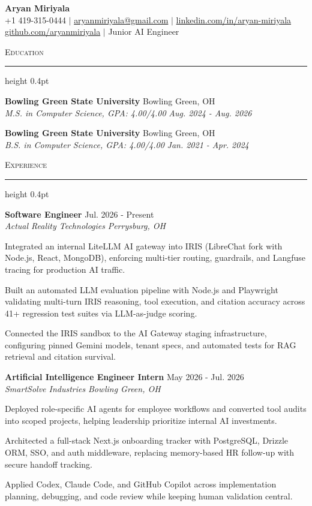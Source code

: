 \documentclass[letterpaper,11pt]{article}
\newcommand{\resumesection}[1]{%
  \par\vspace{2pt}%
  {\large\scshape #1}\par\vspace{2pt}%
  \hrule height 0.4pt\vspace{2pt}%
}
\newcommand{\resumeSubheading}[4]{
  \textbf{#1} \hfill #2\\
  \textit{#3} \hfill \textit{#4}
}
\begin{document}
\begin{center}
  {\LARGE \textbf{Aryan Miriyala}}\\[2pt]
  \small
  +1 419-315-0444 $|$ \href{mailto:aryanmiriyala@gmail.com}{aryanmiriyala@gmail.com} $|$ \href{https://www.linkedin.com/in/aryan-miriyala-7788a21b6/}{linkedin.com/in/aryan-miriyala}\\
  \href{https://github.com/aryanmiriyala}{github.com/aryanmiriyala} $|$ Junior AI Engineer
\end{center}\vspace{-6pt}

\resumesection{Education}
\resumeSubheading
{Bowling Green State University}{Bowling Green, OH}
{M.S. in Computer Science, GPA: 4.00/4.00}{Aug. 2024 - Aug. 2026}

\resumeSubheading
{Bowling Green State University}{Bowling Green, OH}
{B.S. in Computer Science, GPA: 4.00/4.00}{Jan. 2021 - Apr. 2024}

\resumesection{Experience}
\resumeSubheading
{Software Engineer}{Jul. 2026 - Present}
{Actual Reality Technologies}{Perrysburg, OH}
\begin{tightitemize}
  \item Integrated an internal LiteLLM AI gateway into IRIS (LibreChat fork with Node.js, React, MongoDB), enforcing multi-tier routing, guardrails, and Langfuse tracing for production AI traffic.
  \item Built an automated LLM evaluation pipeline with Node.js and Playwright validating multi-turn IRIS reasoning, tool execution, and citation accuracy across 41+ regression test suites via LLM-as-judge scoring.
  \item Connected the IRIS sandbox to the AI Gateway staging infrastructure, configuring pinned Gemini models, tenant specs, and automated tests for RAG retrieval and citation survival.
\end{tightitemize}

\resumeSubheading
{Artificial Intelligence Engineer Intern}{May 2026 - Jul. 2026}
{SmartSolve Industries}{Bowling Green, OH}
\begin{tightitemize}
  \item Deployed role-specific AI agents for employee workflows and converted tool audits into scoped projects, helping leadership prioritize internal AI investments.
  \item Architected a full-stack Next.js onboarding tracker with PostgreSQL, Drizzle ORM, SSO, and auth middleware, replacing memory-based HR follow-up with secure handoff tracking.
  \item Applied Codex, Claude Code, and GitHub Copilot across implementation planning, debugging, and code review while keeping human validation central.
\end{tightitemize}
\end{document}
